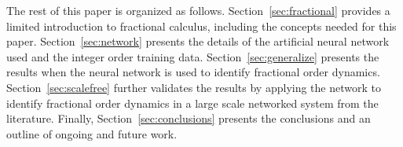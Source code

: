 The rest of this paper is organized as follows. Section~\ref{sec:fractional}
 provides a limited introduction to fractional calculus, including the concepts
 needed for this paper. Section~\ref{sec:network} presents the details of the
 artificial neural network used and the integer order training data.
 Section~\ref{sec:generalize} presents the results when the neural network is
 used to identify fractional order dynamics. Section~\ref{sec:scalefree}
 further validates the results by applying the network to identify fractional
 order dynamics in a large scale networked system from the literature. Finally,
 Section~\ref{sec:conclusions} presents the conclusions and an outline of
 ongoing and future work. 
